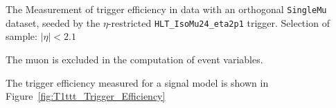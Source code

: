 The Measurement of trigger efficiency in data with an orthogonal \verb!SingleMu! dataset, 
seeded by the $\eta$-restricted \verb!HLT_IsoMu24_eta2p1! trigger.
Selection of sample: $|\eta| < 2.1$

The muon is excluded in the computation of event variables.



The trigger efficiency measured for a signal model is shown in Figure~\ref{fig:T1ttt_Trigger_Efficiency}


\begin{figure}[h!]
  \begin{center}
     ~~
     \\
     ~~
     \\

\end{center}
\end{figure}

